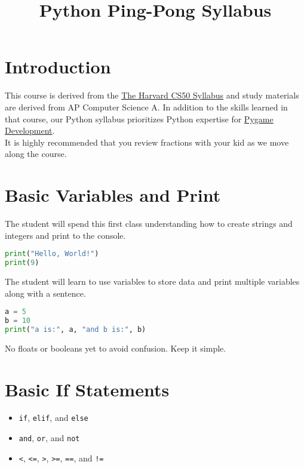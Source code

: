 \documentclass{article}
\title{\vspace{-3em}Python Ping-Pong Syllabus\vspace{-3em}}
\begin{document}
\fontsize{14}{16}\selectfont
\maketitle
\tableofcontents

\section{Introduction}
This course is derived from the \href{https://cs50.harvard.edu/python/2022/syllabus/}{\underline{The Harvard CS50 Syllabus}} and study materials are derived from AP Computer Science A. In addition to the skills learned in that course, our Python syllabus prioritizes Python expertise for \href{https://www.pygame.org/wiki/about}{Pygame Development}. \\

It is highly recommended that you review fractions with your kid as we move along the course.

\section{Basic Variables and Print}
The student will spend this first class understanding how to create strings and integers and print to the console. \\

\begin{lstlisting}[language=Python]
print("Hello, World!")
print(9)
\end{lstlisting}

The student will learn to use variables to store data and print multiple variables along with a sentence.

\begin{lstlisting}[language=Python]
a = 5
b = 10
print("a is:", a, "and b is:", b)
\end{lstlisting}

No floats or booleans yet to avoid confusion. Keep it simple.

\section{Basic If Statements}

\begin{itemize}
    \item \verb|if|, \verb|elif|, and \verb|else|
    \item \verb|and|, \verb|or|, and \verb|not|
    \item \verb|<|, \verb|<=|, \verb|>|, \verb|>=|, \verb|==|, and \verb|!=|
\end{itemize}
\end{document}

